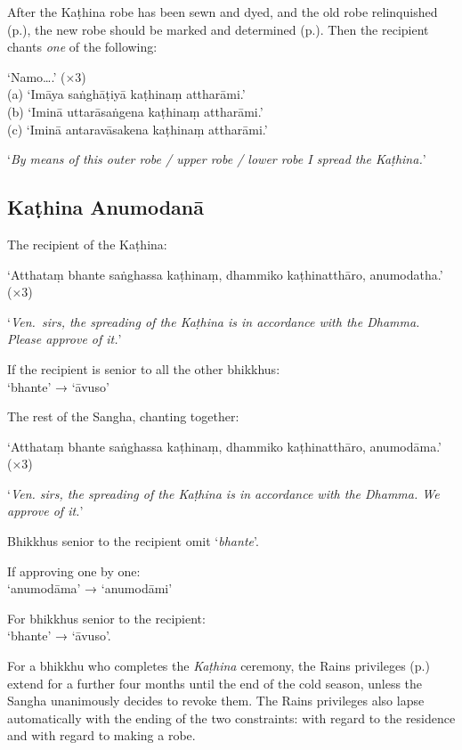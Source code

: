 After the Kaṭhina robe has been sewn and dyed, and the old robe relinquished
(p.\pageref{relinquish-robe}), the new robe should be marked and determined
(p.\pageref{determine-robe}). Then the recipient chants \emph{one} of the
following:

‘Namo….’ (×3)\\
(a) ‘Imāya saṅghāṭiyā kaṭhinaṃ attharāmi.’\\
(b) ‘Iminā uttarāsaṅgena kaṭhinaṃ attharāmi.’\\
(c) ‘Iminā antaravāsakena kaṭhinaṃ attharāmi.’

‘\emph{By means of this outer robe / upper robe / lower robe I spread the Kaṭhina.}’


\subsection{Kaṭhina Anumodanā}
\label{kathina-anumodana}

The recipient of the Kaṭhina:

‘Atthataṃ bhante saṅghassa kaṭhinaṃ, dhammiko kaṭhinatthāro, anumodatha.’ (×3)

‘\emph{Ven.\ sirs, the spreading of the Kaṭhina is in accordance with the Dhamma.
  Please approve of it.}’

If the recipient is senior to all the other bhikkhus:\\
‘bhante’ → ‘āvuso’

The rest of the Sangha, chanting together:

‘Atthataṃ bhante saṅghassa kaṭhinaṃ, dhammiko kaṭhinatthāro, anumodāma.’ (×3)

‘\emph{Ven. sirs, the spreading of the Kaṭhina is in accordance with the Dhamma.
  We approve of it.}’


Bhikkhus senior to the recipient omit ‘\emph{bhante}’.

If approving one by one:\\
‘anumodāma’ → ‘anumodāmi’

For bhikkhus senior to the recipient:\\
‘bhante’ → ‘āvuso’.

For a bhikkhu who completes the \emph{Kaṭhina} ceremony, the Rains privileges
(p.\pageref{rains-privileges}) extend for a further four months until the end of
the cold season, unless the Sangha unanimously decides to revoke them. The Rains
privileges also lapse automatically with the ending of the two constraints: with
regard to the residence and with regard to making a robe.


